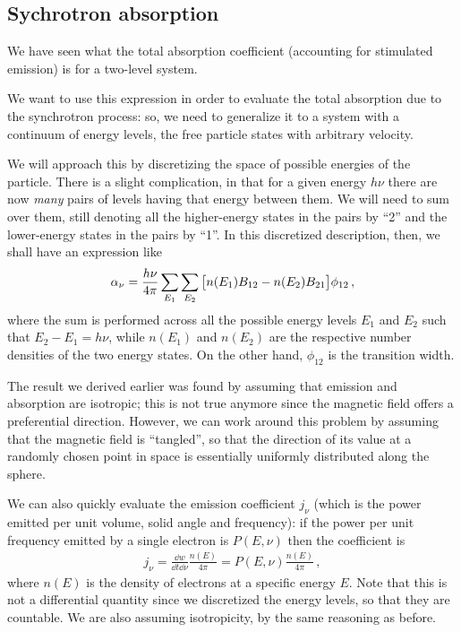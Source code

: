 \documentclass[main.tex]{subfiles}
\begin{document}
\subsection{Sychrotron absorption}


We have seen what the total absorption coefficient (accounting for stimulated emission) is for a two-level system. 

We want to use this expression in order to evaluate the total absorption due to the synchrotron process: so, we need to generalize it to a system with a continuum of energy levels, the free particle states with arbitrary velocity. 

We will approach this by discretizing the space of possible energies of the particle.
There is a slight complication, in that for a given energy \(h \nu \) there are now \emph{many} pairs of levels having that energy between them. We will need to sum over them, still denoting all the higher-energy states in the pairs by ``2'' and the lower-energy states in the pairs by ``1''.
In this discretized description, then, we shall have an expression like 
%
\begin{align}
\alpha _\nu  = \frac{h \nu }{4 \pi } \sum _{E_1 } \sum _{E_2 } 
\qty[n(E_1 ) B_{12} - n(E_2 ) B_{21} ] \phi_{12}
\,,
\end{align}
%
where the sum is performed across all the possible energy levels \(E_1 \) and \(E_2 \) such that \(E_2 - E_1 = h \nu \), while \(n(E_1 )\) and \(n(E_2 )\) are the respective number densities of the two energy states. 
On the other hand, \(\phi_{12} \) is the transition width. 

The result we derived earlier was found by assuming that emission and absorption are isotropic; this is not true anymore since the magnetic field offers a preferential direction.
However, we can work around this problem by assuming that the magnetic field is ``tangled'', so that the direction of its value at a randomly chosen point in space is essentially uniformly distributed along the sphere.

We can also quickly evaluate the emission coefficient \(j_\nu \) (which is the power emitted per unit volume, solid angle and frequency): if the power per unit frequency emitted by a single electron is \(P(E, \nu )\) then the coefficient is 
%
\begin{align}
j_\nu = \frac{ \dd{w}}{ \dd{t} \dd{\nu }} \frac{n(E)}{4 \pi }
= P(E, \nu ) \frac{n(E)}{4 \pi }
\,,
\end{align}
%
where \(n(E)\) is the density of electrons at a specific energy \(E\). 
Note that this is not a differential quantity since we discretized the energy levels, so that they are countable. 
We are also assuming isotropicity, by the same reasoning as before.
\end{document}
